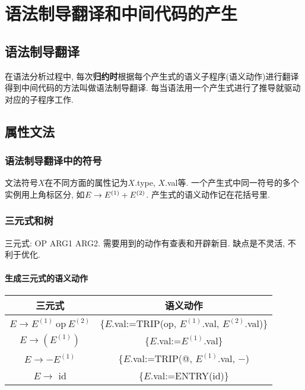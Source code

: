 \chapter{语法制导翻译和中间代码的产生}

    \section{语法制导翻译}

        在语法分析过程中, 每次\textbf{归约时}根据每个产生式的\textsf{语义子程序}(语义动作)进行翻译得到中间代码的方法叫做\textsf{语法制导翻译}. 每当语法用一个产生式进行了推导就驱动对应的子程序工作.

    \section{属性文法}

        \subsection{语法制导翻译中的符号}

            文法符号$X$在不同方面的属性记为$X$.type, $X$.val等. 一个产生式中同一符号的多个实例用上角标区分, 如$E\to E\textsuperscript{(1)}+E\textsuperscript{(2)}$. 产生式的语义动作记在花括号里.

        \subsection{三元式和树}

            三元式: OP ARG1 ARG2. 需要用到的动作有查表和开辟新目. 缺点是不灵活, 不利于优化.

            \subsubsection{生成三元式的语义动作}

                \begin{center}
                    \begin{tabular}[h!]{cc} \toprule
                        三元式 & 语义动作 \\ \midrule
                        $E\to E^{(1)} \mathrm{\ op\ } E^{(2)}$ & \{$E$.val:=TRIP(op, $E^{(1)}$.val, $E^{(2)}$.val)\} \\
                        $E\to (E^{(1)})$ & \{$E$.val:=$E^{(1)}$.val\} \\
                        $E\to -E^{(1)}$ & \{$E$.val:=TRIP(@, $E^{(1)}$.val, $-$) \\
                        $E\to$ id & \{$E$.val:=ENTRY(id)\} \\ \bottomrule
                    \end{tabular}
                \end{center}


